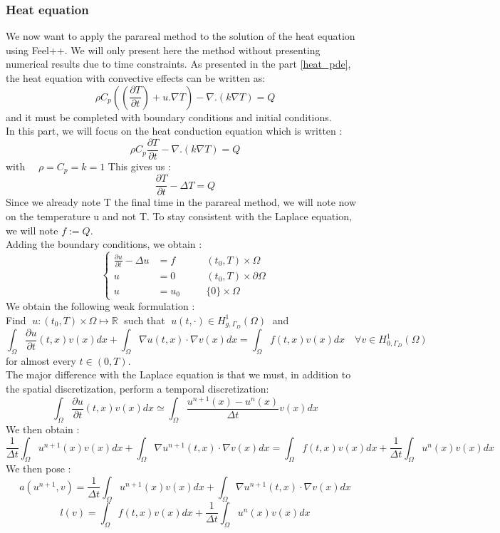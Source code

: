 \subsubsection{Heat equation}
\label{heat}

We now want to apply the parareal method to the solution of the heat equation using Feel++. We will only present here the method without presenting numerical results due to time constraints. As presented in the part \ref{heat_pde}, the heat equation with convective effects can be written as:
$$\rho C_p((\frac{\partial T}{\partial t})+u . \nabla T)-\nabla .(k \nabla T)=Q$$
and it must be completed  with boundary conditions and initial conditions. \\
In this part, we will focus on the heat conduction equation which is written :
$$\rho C_p\frac{\partial T}{\partial t}-\nabla .(k \nabla T)=Q$$
with $\quad \rho=C_p=k=1$
This gives us : \\
$$\frac{\partial T}{\partial t}-\Delta T=Q$$
Since we already note T the final time in the parareal method, we will note now on the temperature u and not T. To stay consistent with the Laplace equation, we will note $f:=Q$. \\
Adding the boundary conditions, we obtain :
\begin{equation}
	\left\{\begin{aligned}
		\frac{\partial u}{\partial t}-\Delta u &= f \quad&&(t_0,T)\times\Omega \\
		u&=0 \quad&&(t_0,T)\times\partial\Omega\\
		u&=u_0 \quad &&\{0\}\times\Omega
	\end{aligned}\right.
\end{equation}
We obtain the following weak formulation : \\
Find $\; u:(t_0,T)\times\Omega \mapsto \mathbb{R} \;$ such that $\; u(t,\cdot)\in H_{g,\Gamma_D}^1(\Omega) \;$ and
$$\int_\Omega \frac{\partial u}{\partial t}(t,x)v(x)dx+\int_\Omega \nabla u(t,x)\cdot\nabla v(x)dx = \int_\Omega f(t,x)v(x)dx \quad \forall v\in H_{0,\Gamma_D}^1(\Omega)$$
for almost every $t\in(0,T)$. \\
The major difference with the Laplace equation is that we must, in addition to the spatial discretization, perform a temporal discretization:
$$\int_\Omega \frac{\partial u}{\partial t}(t,x)v(x)dx \simeq \int_\Omega \frac{u^{n+1}(x)-u^n(x)}{\Delta t}v(x)dx$$
We then obtain :
$$\frac{1}{\Delta t}\int_\Omega u^{n+1}(x)v(x)dx+\int_\Omega \nabla u^{n+1}(t,x)\cdot\nabla v(x)dx = \int_\Omega f(t,x)v(x)dx + \frac{1}{\Delta t}\int_\Omega u^n(x)v(x)dx$$
We then pose :
$$a(u^{n+1},v)=\frac{1}{\Delta t}\int_\Omega u^{n+1}(x)v(x)dx+\int_\Omega \nabla u^{n+1}(t,x)\cdot\nabla v(x)dx$$
$$l(v)=\int_\Omega f(t,x)v(x)dx + \frac{1}{\Delta t}\int_\Omega u^n(x)v(x)dx$$

